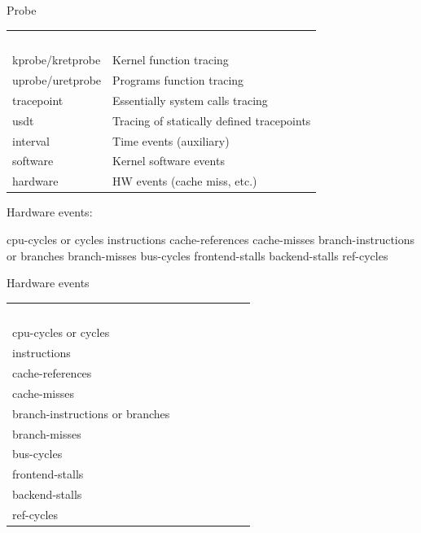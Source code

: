 \begin{reveals}
\begin{frame}[c]{Probe}
  \vfill

  \begin{center}
      \color{deepblue}
    \begin{tabular}{|ll|}
      \arrayrulecolor{deepblue}
          {\cellcolor{deepblue}\textcolor{white}{Probe type}} &
                                                          {\cellcolor{deepblue}\textcolor{white}{Usage}} \\
      kprobe/kretprobe & Kernel function tracing\\
      uprobe/uretprobe& Programs function tracing\\
      tracepoint & Essentially system calls tracing\\
      usdt & Tracing of statically defined tracepoints\\
      interval & Time events (auxiliary)\\
      software & Kernel software events\\
      hardware & HW  events (cache miss, etc.)\\\hline
    \end{tabular}
  \end{center}


\end{frame}
Hardware events:

    cpu-cycles or cycles
    instructions
    cache-references
    cache-misses
    branch-instructions or branches
    branch-misses
    bus-cycles
    frontend-stalls
    backend-stalls
    ref-cycles


\begin{frame}[c,fragile]{Hardware events}
  
  \begin{center}
      \color{deepblue}
    \begin{tabular}{|p{}p{}|}
      \arrayrulecolor{deepblue}
          {\cellcolor{deepblue}\textcolor{white}{Name}} &
                                                          {\cellcolor{deepblue}\textcolor{white}{Raised when}} \\
          cpu-cycles or cycles& \\
    instructions& \\
    cache-references& \\
    cache-misses& \\
    branch-instructions or branches& \\
    branch-misses& \\
    bus-cycles& \\
    frontend-stalls& \\
    backend-stalls& \\
    ref-cycles& \\\hline
    \end{tabular}
  \end{center}


\end{frame}
\end{reveals}
